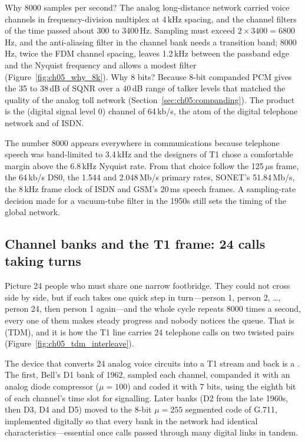 Why 8000 samples per second? The analog long-distance network carried voice channels in
frequency-division multiplex at 4\,kHz spacing, and the channel filters of the time passed
about 300 to 3400\,Hz. Sampling must exceed $2\times3400=6800$\,Hz, and the anti-aliasing filter
in the channel bank needs a transition band; 8000\,Hz, twice the FDM channel spacing, leaves 1.2\,kHz
between the passband edge and the Nyquist frequency and allows a modest filter
(Figure~\ref{fig:ch05_why_8k}). Why 8 bits?
Because 8-bit companded PCM gives the 35 to 38\,dB of SQNR over a 40\,dB range of talker levels
that matched the quality of the analog toll network (Section~\ref{sec:ch05:companding}). The
product is the  (digital signal level 0) channel of 64\,kb/s, the atom of the digital
telephone network and of ISDN.

\begin{history}[title=The 8 kHz heartbeat]
The number 8000 appears everywhere in communications because telephone speech was
band-limited to 3.4\,kHz and the designers of T1 chose a comfortable margin above the
6.8\,kHz Nyquist rate. From that choice follow the 125\,$\mu$s frame, the 64\,kb/s DS0, the
1.544 and 2.048\,Mb/s primary rates, SONET's 51.84\,Mb/s, the 8\,kHz frame clock of
ISDN and GSM's 20\,ms speech frames. A sampling-rate decision made for a vacuum-tube
filter in the 1950s still sets the timing of the global network.
\end{history}

\subsection{Channel banks and the T1 frame: 24 calls taking turns}

Picture 24 people who must share one narrow footbridge. They could not cross side by side, but if
each takes one quick step in turn---person 1, person 2, \dots, person 24, then person 1 again---and
the whole cycle repeats 8000 times a second, every one of them makes steady progress and nobody
notices the queue. That is  (TDM), and it is how the T1 line
carries 24 telephone calls on two twisted pairs (Figure~\ref{fig:ch05_tdm_interleave}).

The device that converts 24 analog voice circuits into a T1 stream and back is a . The first, Bell's D1 bank of 1962, sampled each channel, companded it with an analog diode
compressor ($\mu=100$) and coded it with 7 bits, using the eighth bit of each channel's time
slot for signalling. Later banks (D2 from the late 1960s, then D3, D4 and D5) moved to the
8-bit $\mu=255$ segmented code of G.711, implemented digitally so that every bank in the network
had identical characteristics---essential once calls passed through many digital links in
tandem.

